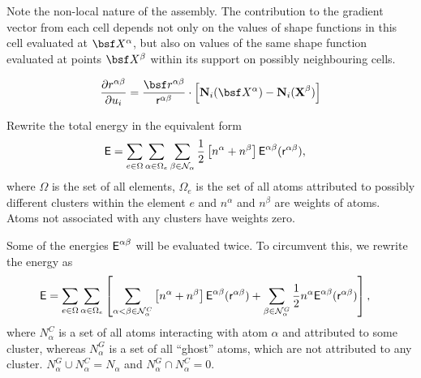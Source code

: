 \documentclass[a4paper,10pt]{article}
\def\gz  #1{           \mbox{$\mathbf{#1}$}}
\def\msf  #1{           \mbox{\!\!      $\sf #1$}}
\def\mcl  #1{               {\cal #1}}
\begin{document}
Note the non-local nature of the assembly. The contribution to the gradient vector from each cell depends not only on the values of shape functions in this cell evaluated at $\bsf X^\alpha$, but also on values of the same shape function evaluated at points $\bsf X^\beta$ within its support on possibly neighbouring cells.

\begin{align}
\frac{\partial r^{\alpha\beta}}{\partial u_i} = \frac{\bsf r^{\alpha\beta}}{\msf r^{\alpha\beta}} \cdot \left[\gz N_i (\bsf X^\alpha) - \gz N_i (\gz X^\beta) \right]
\end{align}


Rewrite the total energy in the equivalent form
\begin{align}
\msf E &= \sum_{e \in \Omega} \sum_{\alpha \in \Omega_e} \sum_{\beta \in \mcl N_\alpha} \frac{1}{2} \left[n^\alpha + n^\beta\right] \msf E^{\alpha \beta} (\msf r^{\alpha\beta}),
\end{align}
where $\Omega$ is the set of all elements, $\Omega_e$ is the set of all atoms attributed to possibly different clusters within the element $e$ and $n^\alpha$ and $n^\beta$ are weights of atoms. Atoms not associated with any clusters have weights zero.


Some of the energies $\msf E^{\alpha\beta}$ will be evaluated twice. To circumvent this, we rewrite the energy as
\begin{align}
\msf E &= \sum_{e \in \Omega} \sum_{\alpha \in \Omega_e}
\left[
\sum_{\alpha < \beta \in \mcl N_\alpha^C} \left[n^\alpha + n^\beta\right] \msf E^{\alpha \beta} (\msf r^{\alpha\beta})
+
\sum_{\beta \in \mcl N_\alpha^G} \frac{1}{2} n^\alpha \msf E^{\alpha \beta} (\msf r^{\alpha\beta})
\right],
\end{align}
where $N_\alpha^C$ is a set of all atoms interacting with atom $\alpha$ and attributed to some cluster, whereas
$N_\alpha^G$ is a set of all ``ghost'' atoms, which are not attributed to any cluster.
$N_\alpha^G \cup N_\alpha^C = N_\alpha$ and $N_\alpha^G \cap N_\alpha^C =  0$.
\end{document}
